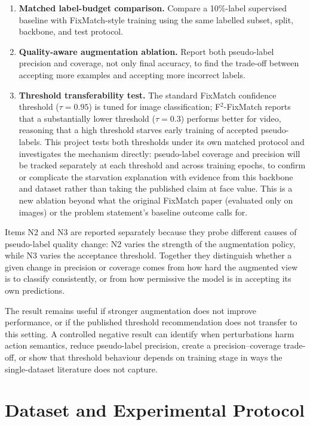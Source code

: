 \documentclass[11pt,a4paper]{article}
\begin{document}
\begin{enumerate}[label=\textbf{N\arabic*.}]
  \item \textbf{Matched label-budget comparison.} Compare a 10\%-label supervised baseline with FixMatch-style training using the same labelled subset, split, backbone, and test protocol.
  \item \textbf{Quality-aware augmentation ablation.} Report both pseudo-label precision and coverage, not only final accuracy, to find the trade-off between accepting more examples and accepting more incorrect labels.
  \item \textbf{Threshold transferability test.} The standard FixMatch confidence threshold ($\tau=0.95$) is tuned for image classification; F$^2$-FixMatch \cite{f2fixmatch} reports that a substantially lower threshold ($\tau=0.3$) performs better for video, reasoning that a high threshold starves early training of accepted pseudo-labels. This project tests both thresholds under its own matched protocol and investigates the mechanism directly: pseudo-label coverage and precision will be tracked separately at each threshold and across training epochs, to confirm or complicate the starvation explanation with evidence from this backbone and dataset rather than taking the published claim at face value. This is a new ablation beyond what the original FixMatch paper (evaluated only on images) or the problem statement's baseline outcome calls for.
\end{enumerate}

Items N2 and N3 are reported separately because they probe different causes of pseudo-label quality change: N2 varies the strength of the augmentation policy, while N3 varies the acceptance threshold. Together they distinguish whether a given change in precision or coverage comes from how hard the augmented view is to classify consistently, or from how permissive the model is in accepting its own predictions.

The result remains useful if stronger augmentation does not improve performance, or if the published threshold recommendation does not transfer to this setting. A controlled negative result can identify when perturbations harm action semantics, reduce pseudo-label precision, create a precision--coverage trade-off, or show that threshold behaviour depends on training stage in ways the single-dataset literature does not capture.

\section{Dataset and Experimental Protocol}
\end{document}

